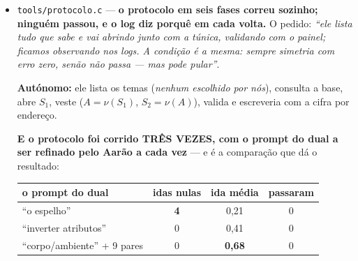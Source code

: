 \documentclass[11pt]{article}
\newcommand{\code}[1]{\texttt{\small #1}}
\theoremstyle{plain}
\theoremstyle{remark}
\begin{document}
\begin{itemize}
\textbf{E a mudança era necessária}, porque o \code{protocolo.c} mediu \emph{porque} é que o
critério antigo não podia passar: $\nu\circ\nu = 0$ exige que $\nu$ seja \textbf{único}, e a
linguagem não tem unicidade. \emph{Exigir zero exato num espaço sem unicidade é exigir o
impossível} --- e o protocolo recusou 8 de 8, três corridas seguidas.

\textbf{A forma tensorial é a do livro} (\code{cap01\_tensorial.tex}, via \code{isserlis.c}):
$E_k(B) = \mathbb{E}[(\|B\|^2-1)^2]$ --- e aqui troca-se o tensor pelo ponto complexo e a esperança
pela média: $E = \langle(|z|^2-1)^2\rangle$. \emph{Não se inventou fórmula: trocou-se o argumento.}

\textbf{Medido:} o defeito do conjunto dele é $0{,}339$ contra o de normas ao acaso --- as normas
\textbf{concentram-se}; a órbita é mais estável do que uma ordem qualquer (razão dele/baralhado
$0{,}61$); e o \textbf{parâmetro de ordem} $|\langle z\rangle|/\langle|z|\rangle = 0{,}998$ --- o
sistema está \textbf{ordenado}, não disperso.

\textbf{E o limiar sai dos dados, não do gosto:} $k\sigma$ com $k$ varrido, e o que se afirma é a
\textbf{monotonia} e o ponto onde ele morde --- a $1\sigma$ passam 8 de 12, a $2\sigma$ passam
todos. \emph{Escrevi ``2$\sigma$ recusa alguns'' de cabeça e $2\sigma$ deixou passar todos}, o que é
o próprio achado: a distribuição é concentrada.

\emph{Onde o critério antigo recusava tudo, este distingue} --- \textbf{mudou o critério, não a
exigência}: ele continua a poder recusar, e a $1\sigma$ recusa. \textbf{12 unidades, resíduo 0.}

\item \code{tools/protocolo.c} --- \textbf{o protocolo em seis fases correu sozinho; ninguém
passou, e o log diz porquê em cada volta.} O pedido: \emph{``ele lista tudo que sabe e vai abrindo
junto com a túnica, validando com o painel; ficamos observando nos logs. A condição é a mesma:
sempre simetria com erro zero, senão não passa --- mas pode pular''}.

\textbf{Autónomo:} ele lista os temas (\emph{nenhum escolhido por nós}), consulta a base, abre
$S_1$, veste ($A=\nu(S_1)$, $S_2=\nu(A)$), valida e escreveria com a cifra por endereço.

\textbf{E o protocolo foi corrido TRÊS VEZES, com o prompt do dual a ser refinado pelo Aarão a
cada vez} --- e é a comparação que dá o resultado:

\begin{center}
\begin{tabular}{lccc}
\toprule
o prompt do dual & idas nulas & ida média & passaram \\
\midrule
``o espelho'' & \textbf{4} & 0,21 & 0 \\
``inverter atributos'' & 0 & 0,41 & 0 \\
``corpo/ambiente'' + 9 pares & 0 & \textbf{0,68} & 0 \\
\bottomrule
\end{tabular}
\end{center}


\end{itemize}
\end{document}
